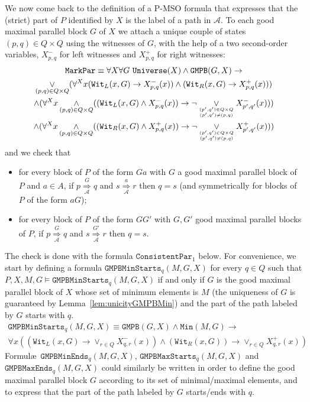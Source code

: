 \documentclass{CSML}
\begin{document}
We now come back to the definition of a P-MSO formula that expresses that the (strict) part of $P$ identified by $X$ is the label of a path in $\mathcal{A}$.
To each good maximal parallel block $G$ of $X$ we attach a unique couple of states $(p,q)\in Q\times Q$ using the witnesses of $G$, with the help of a two second-order variables, $X^-_{p,q}$ for left witnesses and $X^+_{p,q}$ for right witnesses:
\begin{multline*}
  \texttt{MarkPar}\equiv\forall X\forall G\ \texttt{Universe}(X)\land\texttt{GMPB}(G,X)\rightarrow\\
  \mathop\lor_{(p,q)\in Q\times Q}(\forall^X x (\texttt{Wit}_L(x,G)\rightarrow X^-_{p,q}(x))\land (\texttt{Wit}_R(x,G)\rightarrow X^+_{p,q}(x)) )\\
  \land (\forall^X x\mathop\land_{(p,q)\in Q\times Q} ((\texttt{Wit}_L(x,G)\land X^-_{p,q}(x))\rightarrow \lnot\mathop\lor_{(p',q')\in Q\times Q\atop (p',q')\not=(p,q)}X^-_{p',q'}(x)))\\
  \land (\forall^X x\mathop\land_{(p,q)\in Q\times Q} ((\texttt{Wit}_R(x,G)\land X^+_{p,q}(x))\rightarrow \lnot\mathop\lor_{(p',q')\in Q\times Q\atop (p',q')\not=(p,q)}X^+_{p',q'}(x)))
\end{multline*}
and we check that
\begin{itemize}
\item for every block of $P$ of the form $Ga$ with $G$ a good maximal parallel block of $P$ and $a\in A$, if $p \mathop{\Longrightarrow}\limits_{\mathcal{A}}^{G} q$ and $s \mathop{\Longrightarrow}\limits_{\mathcal{A}}^{a} r$ then $q=s$ (and symmetrically for blocks of $P$ of the form $aG$);
\item for every block of $P$ of the form $GG'$ with $G,G'$ good maximal parallel blocks of $P$, if $p \mathop{\Longrightarrow}\limits_{\mathcal{A}}^{G} q$ and $s \mathop{\Longrightarrow}\limits_{\mathcal{A}}^{G'} r$ then $q=s$.
\end{itemize}

The check is done with the formula $\texttt{ConsistentPar}_1$ below.
For convenience, we start by defining a formula $\texttt{GMPBMinStarts}_q(M,G,X)$ for every $q\in Q$ such that $P,X,M,G\models \texttt{GMPBMinStarts}_q(M,G,X)$ if and only if $G$ is the good maximal parallel block of $X$ whose set of minimum elements is $M$ (the uniqueness of $G$ is guaranteed by Lemma~\ref{lem:unicityGMPBMin}) and the part of the path labeled by $G$ starts with $q$.
\begin{multline*}
  \texttt{GMPBMinStarts}_q(M,G,X)\equiv \texttt{GMPB}(G,X)\land \texttt{Min}(M,G)\rightarrow\\
  \forall x ((\texttt{Wit}_L(x,G)\rightarrow \mathop\lor_{r\in Q}X^-_{q,r}(x))\land(\texttt{Wit}_R(x,G))\rightarrow \mathop\lor_{r\in Q}X^+_{q,r}(x)) 
\end{multline*}
Formul{\ae}\ $\texttt{GMPBMinEnds}_q(M,G,X)$, $\texttt{GMPBMaxStarts}_q(M,G,X)$ and $\texttt{GMPBMaxEnds}_q(M,G,X)$ could similarly be written in order to define the good maximal parallel block $G$ according to its set of minimal/maximal elements, and to express that the part of the path labeled by $G$ starts/ends with $q$.
\end{document}
